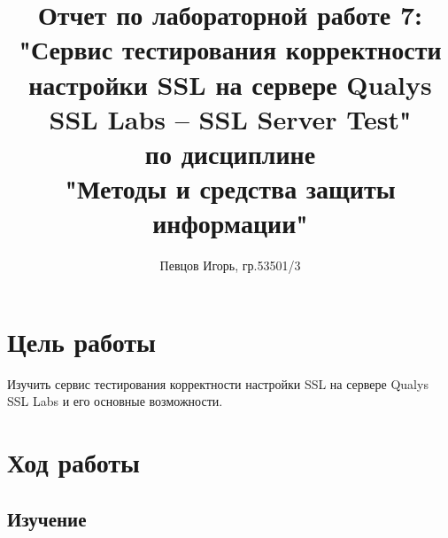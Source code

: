 \documentclass[a4paper, 14pt]{article}				%
\author{Певцов Игорь, гр.53501/3}
\title{Отчет по лабораторной работе 7:\\"Сервис тестирования корректности настройки SSL на сервере Qualys SSL Labs – SSL Server Test"\\ по дисциплине\\"Методы и средства защиты информации"}
\begin{document}
\maketitle

\newpage
\tableofcontents{}

\newpage
\section{Цель работы}
Изучить сервис тестирования корректности настройки SSL на сервере Qualys SSL Labs и его основные возможности.
\section{Ход работы}
\subsection{Изучение}
\end{document}
